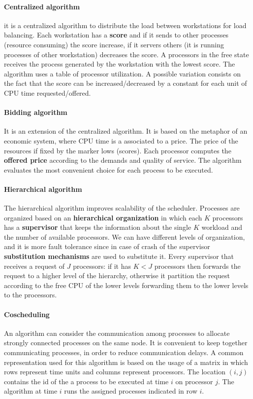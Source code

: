\paragraph{Centralized algorithm} it is a centralized algorithm to distribute the load between workstations for load balancing. Each workstation has a \textbf{score} and if it sends to other processes (resource consuming) the score increase, if it servers others (it is running processes of other workstation) decreases the score. A processors in the free state receives the process generated by the workstation with the lowest score. The algorithm uses a table of processor utilization. A possible variation consists on the fact that the score can be increased/decreased by a constant for each unit of CPU time requested/offered.

\paragraph{Bidding algorithm} It is an extension of the centralized algorithm. It is based on the metaphor of an economic system, where CPU time is a associated to a price. The price of the resources if fixed by the marker lows (scores). Each processor computes the \textbf{offered price} according to the demands and quality of service. The algorithm evaluates the most convenient choice for each process to be executed.

\paragraph{Hierarchical algorithm}
The hierarchical algorithm improves scalability of the scheduler. Processes are organized based on an \textbf{hierarchical organization} in which each $K$ processors has a \textbf{supervisor} that keeps the information about the single $K$ workload and the number of available processors. We can have different levels of organization, and it is more fault tolerance since in case of crash of the supervisor \textbf{substitution mechanisms} are used to substitute it.
Every supervisor that receives a request of $J$ processors: if it has $K < J$ processors then forwards the request to a higher level of the hierarchy, otherwise it partition the request according to the free CPU of the lower levels forwarding them to the lower levels to the processors.

\paragraph{Coscheduling} An algorithm can consider the communication among processes to allocate strongly connected processes on the same node. It is convenient to keep together communicating processes, in order to reduce communication delays.
A common representation used for this algorithm is based on the usage of a matrix in which rows represent time units and columns represent processors. The location $(i,j)$ contains the id of the a process to be executed at time $i$ on processor $j$. The algorithm at time $i$ runs the assigned processes indicated in row $i$.
